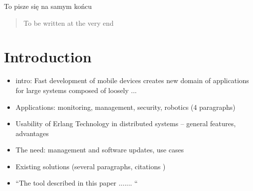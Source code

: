 \documentclass[10pt]{article}
\begin{document}
\begin{opening}



\author{Małgorzata Wielgus\affiliation
            {AGH University of Science and Technology,
             Kraków, Poland,
             \texttt{malgorza@student.agh.edu.pl}},
        Przemysław Dąbek\affiliation
           {AGH University of Science and Technology,
             Kraków, Poland,
             \texttt{przemyslaw.dabek@gmail.com}},
        Roman Janusz\affiliation
           {AGH University of Science and Technology,
             Kraków, Poland,
             \texttt{roman@student.agh.edu.pl}},
        \\Tomasz Kowal\affiliation
           {AGH University of Science and Technology,
             Kraków, Poland,
             \texttt{tomekowal@gmail.com}},
        Wojciech Turek\affiliation
            {AGH University of Science and Technology,
             Kraków, Poland,
             \texttt{wojciech.turek@agh.edu.pl}}}


\begin{streszczenie}
To pisze się na samym końcu

\end{streszczenie}

\begin{abstract}
To be written at the very end

\end{abstract}

\end{opening}







\section{Introduction}



\begin{itemize}
	\item intro: Fast development of mobile devices creates new domain of applications for large systems composed of loosely ...
	\item Applications: monitoring, management, security, robotics (4 paragraphs)
	\item Usability of Erlang Technology in distributed systems -- general features, advantages
	\item The need: management and software updates, use cases 
	\item Existing solutions (several paragraphs, citations \cite{asoc}) 
	\item ``The tool described in this paper ....... ``
\end{itemize}
\end{document}
